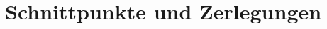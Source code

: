 \renewcommand{\subdir}{SchnittpunkteUndZerlegungen/}

\ifproblem
\section{Schnittpunkte und Zerlegungen}
\fi





